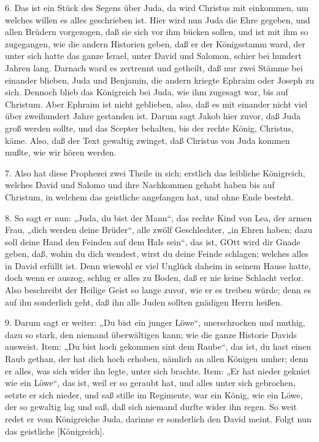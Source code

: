 6. Das ist ein Stück des Segens über Juda, da wird Christus mit einkommen, um welches willen es alles geschrieben ist. Hier wird nun Juda die Ehre gegeben, und allen Brüdern vorgezogen, daß sie sich vor ihm bücken sollen, und ist mit ihm so zugegangen, wie die andern Historien geben, daß er der Königsstamm ward, der unter sich hatte das ganze Israel, unter David und Salomon, schier bei hundert Jahren lang. Darnach ward es zertrennt und getheilt, daß nur zwei Stämme bei einander blieben, Juda und Benjamin, die andern kriegte Ephraim oder Joseph zu sich. Dennoch blieb das Königreich bei Juda, wie ihm zugesagt war, bis auf Christum. Aber Ephraim ist nicht geblieben, also, daß es mit einander nicht viel über zweihundert Jahre gestanden ist. Darum sagt Jakob hier zuvor, daß Juda groß werden sollte, und das Scepter behalten, bis der rechte König, Christus, käme. Also, daß der Text gewaltig zwinget, daß Christus von Juda kommen mußte, wie wir hören werden.

7. Also hat diese Prophezei zwei Theile in sich; erstlich das leibliche Königreich, welches David und Salomo und ihre Nachkommen gehabt haben bis auf Christum, in welchem das geistliche angefangen hat, und ohne Ende besteht.

8. So sagt er nun: „Juda, du bist der Mann“, das rechte Kind von Lea, der armen Frau, „dich werden deine Brüder“, alle zwölf Geschlechter, „in Ehren haben; dazu soll deine Hand den Feinden auf dem Hals sein“, das ist, GOtt wird dir Gnade geben, daß, wohin du dich wendest, wirst du deine Feinde schlagen; welches alles in David erfüllt ist. Denn wiewohl er viel Unglück daheim in seinem Hause hatte, doch wenn er auszog, schlug er alles zu Boden, daß er nie keine Schlacht verlor. Also beschreibt der Heilige Geist so lange zuvor, wie er es treiben würde; denn es auf ihn sonderlich geht, daß ihn alle Juden sollten gnädigen Herrn heißen.

9. Darum sagt er weiter: „Du bist ein junger Löwe“, unerschrocken und muthig, dazu so stark, den niemand überwältigen kann; wie die ganze Historie Davids ausweist. Item: „Du bist hoch gekommen sint dem Raube“, das ist, du hast einen Raub gethan, der hat dich hoch erhoben, nämlich an allen Königen umher; denn er alles, was sich wider ihn legte, unter sich brachte. Item: „Er hat nieder gekniet wie ein Löwe“, das ist, weil er so geraubt hat, und alles unter sich gebrochen, setzte er sich nieder, und saß stille im Regimente, war ein König, wie ein Löwe, der so gewaltig lag und saß, daß sich niemand durfte wider ihn regen. So weit redet er vom Königreiche Juda, darinne er sonderlich den David meint. Folgt nun das geistliche [Königreich].

